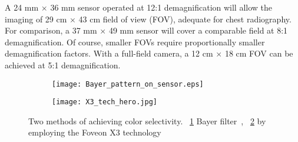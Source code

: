 A 24 mm $\times$ 36 mm sensor operated at 12:1 demagnification will allow the imaging of 29 cm $\times$ 43 cm field of view (FOV), adequate for chest radiography. For comparison, a 37 mm $\times$ 49 mm sensor will cover a comparable field at 8:1 demagnification. Of course, smaller FOVs require proportionally smaller demagnification factors.  With a full-field camera, a 12 cm $\times$ 18 cm FOV can be achieved at 5:1 demagnification.

\begin{figure}[h]
	\begin{subfigure}[b]{0.4\linewidth}
		\centering
		\texttt{[image: Bayer\_pattern\_on\_sensor.eps]}
		\caption{}
		\label{fig:bayer_pattern_on_sensor}
	\end{subfigure}
	\hspace{0.5cm}
	\begin{subfigure}[b]{0.4\linewidth}
		\centering
		\texttt{[image: X3\_tech\_hero.jpg]}
		\caption{}
		\label{fig:foveon_sensor}
	\end{subfigure}
\caption{Two methods of achieving color selectivity. ~\ref{fig:bayer_pattern_on_sensor} Bayer filter~\citep{wikibayer}, ~\ref{fig:foveon_sensor} by employing the Foveon X3 technology~\citep{foveon}}
\label{fig:color_selectivity}	
\end{figure}

